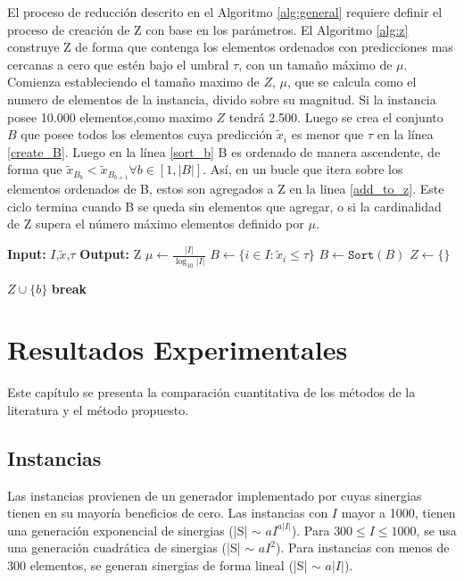\documentclass[spanish, a4paper, 12pt, openany,final]{book}
\begin{document}
 
 El proceso de reducción descrito en el Algoritmo \ref{alg:general} requiere definir el proceso de creación de Z con base en los parámetros. El Algoritmo \ref{alg:z} construye Z de forma que contenga los elementos ordenados con predicciones mas cercanas a cero que estén bajo el umbral $\tau$, con un tamaño máximo de $\mu$. Comienza estableciendo el tamaño maximo de $Z$, $\mu$, que se calcula como el numero de elementos de la instancia, divido sobre su magnitud. Si la instancia posee 10.000 elementos,como maximo $Z$ tendrá 2.500. Luego se crea el conjunto $B$ que posee todos los elementos cuya predicción $\tilde{x}_i$ es menor que $\tau$ en la línea \ref{create_B}. Luego en la línea  \ref{sort_b} B es ordenado de manera ascendente, de forma que $\tilde{x}_{B_b} < \tilde{x}_{B_{b+1}}   \forall b \in [1,|B|]$. Así, en un bucle que itera sobre los elementos ordenados de B, estos son agregados a Z en la linea \ref{add_to_z}. Este ciclo termina cuando B se queda sin elementos que agregar, o si la cardinalidad de Z supera el número máximo elementos definido por $\mu$.
 
    \begin{algorithm}[H]
 	\caption{$Z(I,\tilde{x},\tau)$}\label{alg:z}
 	\begin{algorithmic}[1]
 		\Statex \textbf{Input:} $I$,$\tilde{x}$,$\tau$
 		\Statex \textbf{Output:} Z
 		\State $\mu \gets \frac{|I|}{\log_{10}{|I|}}$ \label{alg2:def_mu} 
 		\State $B \gets \{ i \in I: \tilde{x}_i \leq \tau \}$ \label{create_B}
 		\State $B \gets \mathtt{Sort}(B)$  \label{sort_b}
 		\State $Z \gets \{\}$	  
 		
 		\State $Z \cup \{b\} $ \label{add_to_z}
 		\label{if_c}
 		\State \textbf{break} \label{break}
 		\EndIf
 		\EndFor
 	\end{algorithmic}
 \end{algorithm}
 
 
 
 
\clearpage
\chapter{Resultados Experimentales}
Este capítulo se presenta la comparación cuantitativa de los métodos de la literatura y el método propuesto.

\section{Instancias}

Las instancias provienen de un generador implementado por \cite{baldo_polynomial_2023} cuyas sinergias tienen en su mayoría beneficios de cero. Las instancias con $I$ mayor a 1000, tienen una generación exponencial de sinergias (|S| $\sim$ $aI^{a|I|}$). Para $300 \le I \le 1000$, se usa una generación cuadrática de sinergias (|S| $\sim$ $aI^{2}$). Para instancias con menos de 300 elementos, se generan sinergias de forma lineal (|S| $\sim$ $a|I|$).
\end{document}
